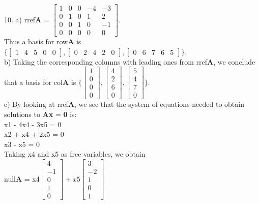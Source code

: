 \documentclass{article}
\begin{document}
    10. a) rref\textbf{A} = $\begin{bmatrix} 1 & 0 & 0 & -4 & -3\\ 0 & 1 & 0 & 1 & 2\\ 0 & 0 & 1 & 0 & -1\\ 0 & 0 & 0 & 0 & 0\end{bmatrix}$. \\
    Thus a basis for row\textbf{A} is $\{\begin{bmatrix} 1 & 4 & 5 & 0 & 0\end{bmatrix}, \begin{bmatrix} 0 & 2 & 4 & 2 & 0\end{bmatrix}, \begin{bmatrix} 0 & 6 & 7 & 6 & 5\end{bmatrix}\}$. \\
    b) Taking the corresponding columns with leading ones from rref\textbf{A}, we conclude that a basis for col\textbf{A} is $\Biggl\{\begin{bmatrix} 1 \\ 0 \\ 0 \\ 0\end{bmatrix}, \begin{bmatrix} 4 \\ 2 \\ 6 \\ 0\end{bmatrix}, \begin{bmatrix} 5 \\ 4 \\ 7 \\ 0\end{bmatrix}\Biggl\}$. \\
    c) By looking at rref\textbf{A}, we see that the system of equations needed to obtain solutions to \textbf{Ax} = \textbf{0} is:\\
    x1 - 4x4 - 3x5 = 0 \\
    x2 + x4 + 2x5 = 0 \\
    x3 - x5 = 0 \\
    Taking x4 and x5 as free variables, we obtain\\
    null\textbf{A} = x4$\begin{bmatrix} 4 \\ -1 \\ 0 \\ 1 \\ 0\end{bmatrix} + x5\begin{bmatrix} 3 \\ -2 \\ 1 \\ 0 \\ 1\end{bmatrix}$ \\
\end{document}

